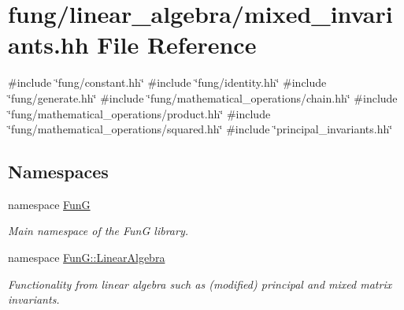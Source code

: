 \hypertarget{mixed__invariants_8hh}{\section{fung/linear\-\_\-algebra/mixed\-\_\-invariants.hh \-File \-Reference}
\label{mixed__invariants_8hh}
}
{\ttfamily \#include \char`\"{}fung/constant.\-hh\char`\"{}}\*
{\ttfamily \#include \char`\"{}fung/identity.\-hh\char`\"{}}\*
{\ttfamily \#include \char`\"{}fung/generate.\-hh\char`\"{}}\*
{\ttfamily \#include \char`\"{}fung/mathematical\-\_\-operations/chain.\-hh\char`\"{}}\*
{\ttfamily \#include \char`\"{}fung/mathematical\-\_\-operations/product.\-hh\char`\"{}}\*
{\ttfamily \#include \char`\"{}fung/mathematical\-\_\-operations/squared.\-hh\char`\"{}}\*
{\ttfamily \#include \char`\"{}principal\-\_\-invariants.\-hh\char`\"{}}\*
\subsection*{\-Namespaces}
\begin{DoxyCompactItemize}
\item 
namespace \hyperlink{namespaceFunG}{\-Fun\-G}
\begin{DoxyCompactList}\small\item\em \-Main namespace of the \-Fun\-G library. \end{DoxyCompactList}\item 
namespace \hyperlink{namespaceFunG_1_1LinearAlgebra}{\-Fun\-G\-::\-Linear\-Algebra}
\begin{DoxyCompactList}\small\item\em \-Functionality from linear algebra such as (modified) principal and mixed matrix invariants. \end{DoxyCompactList}\end{DoxyCompactItemize}

